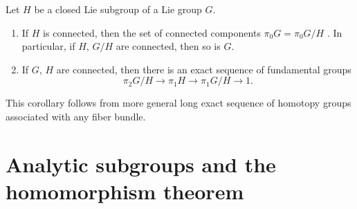 \begin{corollary}
  Let $H$ be a closed Lie subgroup of a Lie group $G$.
  \begin{enumerate}[label=\textnormal{(\arabic*)}]
  \item If $H$ is connected, then the set of connected components
    $\pi_0G=\pi_0G/H$ . In particular, if $H$, $G/H$ are connected, then so
    is $G$.
  \item If $G$, $H$ are connected, then there is an exact sequence of
    fundamental groups
    \[
      \pi_2G/H\longrightarrow
      \pi_1H\longrightarrow
      \pi_1G/H\longrightarrow
      1.
    \]
  \end{enumerate}
\end{corollary}
This corollary follows from more general long exact sequence of homotopy
groups associated with any fiber bundle.

\section{Analytic subgroups and the homomorphism theorem}


